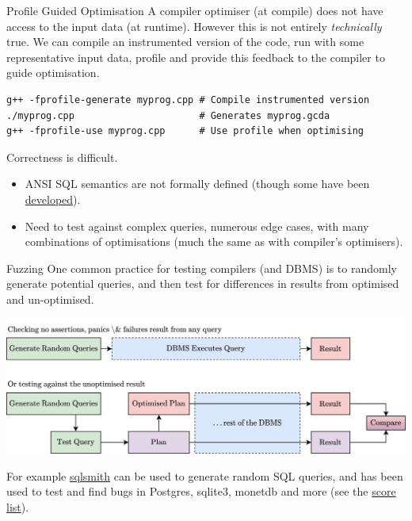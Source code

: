 \begin{sidenotebox}{Profile Guided Optimisation}
    A compiler optimiser (at compile) does not have access to the input data (at runtime). However this is not entirely \textit{technically} true. We can compile an instrumented version of the code, run with some representative input data, profile and provide this feedback to the compiler to guide optimisation.
    \begin{verbatim}
g++ -fprofile-generate myprog.cpp # Compile instrumented version
./myprog.cpp                      # Generates myprog.gcda
g++ -fprofile-use myprog.cpp      # Use profile when optimising
    \end{verbatim}
\end{sidenotebox} 

Correctness is difficult.
\begin{itemize}
    \item ANSI SQL semantics are not formally defined (though some have been \href{https://dl.acm.org/doi/10.1145/111197.111212}{developed}).
    \item Need to test against complex queries, numerous edge cases, with many combinations of optimisations (much the same as with compiler's optimisers).
\end{itemize}

\begin{sidenotebox}{Fuzzing}
    One common practice for testing compilers (and DBMS) is to randomly generate potential queries, and then test for differences in results from optimised and un-optimised.
    \begin{center}
        \includegraphics[width=.8\textwidth]{optimisation/images/fuzzing.drawio.png}
    \end{center}
    For example \href{https://github.com/anse1/sqlsmith}{sqlsmith} can be used to generate random SQL queries, and has been used to test and find bugs in Postgres, sqlite3, monetdb and more (see the \href{https://github.com/anse1/sqlsmith/wiki#score-list}{score list}).
\end{sidenotebox}

